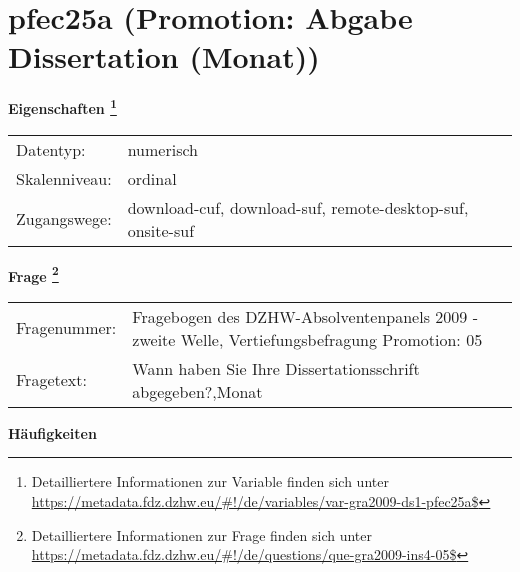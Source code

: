 
    \setcounter{footnote}{0}

    \vspace*{-1.8cm}
	\section{pfec25a (Promotion: Abgabe Dissertation (Monat))}
	\label{section:pfec25a}



    \vspace*{0.5cm}
    \noindent\textbf{Eigenschaften
	\footnote{Detailliertere Informationen zur Variable finden sich unter
		\url{https://metadata.fdz.dzhw.eu/\#!/de/variables/var-gra2009-ds1-pfec25a$}}}\\
	\begin{tabularx}{\hsize}{@{}lX}
	Datentyp: & numerisch \\
	Skalenniveau: & ordinal \\
	Zugangswege: &
	  download-cuf, 
	  download-suf, 
	  remote-desktop-suf, 
	  onsite-suf
 \\
    \end{tabularx}



				\vspace*{0.5cm}
                \noindent\textbf{Frage
	                \footnote{Detailliertere Informationen zur Frage finden sich unter
		              \url{https://metadata.fdz.dzhw.eu/\#!/de/questions/que-gra2009-ins4-05$}}}\\
				\begin{tabularx}{\hsize}{@{}lX}
					Fragenummer: &
					  Fragebogen des DZHW-Absolventenpanels 2009 - zweite Welle, Vertiefungsbefragung Promotion:
					  05
 \\
					Fragetext: & Wann haben Sie Ihre Dissertationsschrift abgegeben?,Monat \\
				\end{tabularx}





        		\vspace*{0.5cm}
                \noindent\textbf{Häufigkeiten}

